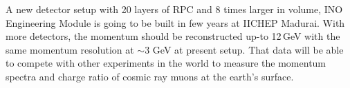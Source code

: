 A new detector setup with 20 layers of RPC and 8 times larger in volume,
INO Engineering Module is going to be built in few years at IICHEP
Madurai. With more detectors, the momentum should be
reconstructed up-to 12\,GeV with the same momentum resolution at
$\sim$3 GeV at present setup. That data will be able to compete
with other experiments in the world to measure the momentum spectra
and charge ratio of cosmic ray muons at the earth's surface.
